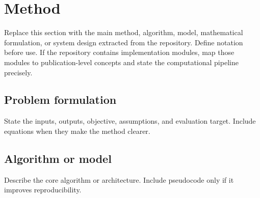 \section{Method}
\label{sec:method}

Replace this section with the main method, algorithm, model, mathematical formulation, or system design extracted from the repository. Define notation before use. If the repository contains implementation modules, map those modules to publication-level concepts and state the computational pipeline precisely.

\subsection{Problem formulation}
\label{subsec:problem_formulation}

State the inputs, outputs, objective, assumptions, and evaluation target. Include equations when they make the method clearer.

\subsection{Algorithm or model}
\label{subsec:algorithm_model}

Describe the core algorithm or architecture. Include pseudocode only if it improves reproducibility.
